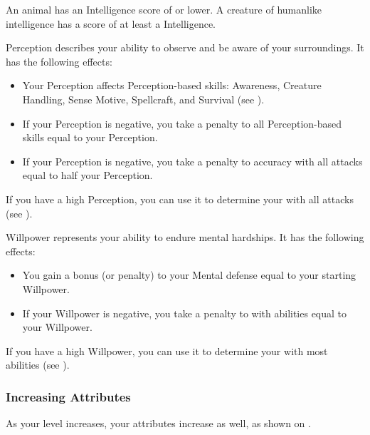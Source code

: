                 \par An animal has an Intelligence score of  or lower.
                A creature of humanlike intelligence has a score of at least a  Intelligence.

            \label{Perception}
                Perception describes your ability to observe and be aware of your surroundings.
                It has the following effects:
                \begin{itemize}
                    \item Your Perception affects Perception-based skills: Awareness, Creature Handling, Sense Motive, Spellcraft, and Survival (see ).
                    \item If your Perception is negative, you take a penalty to all Perception-based skills equal to your Perception.
                    \item If your Perception is negative, you take a penalty to accuracy with all attacks equal to half your Perception.
                \end{itemize}

                If you have a high Perception, you can use it to determine your  with all attacks (see ).

            \label{Willpower}
                Willpower represents your ability to endure mental hardships.
                It has the following effects:
                \begin{itemize}
                    \item You gain a bonus (or penalty) to your Mental defense equal to your starting Willpower.
                    \item If your Willpower is negative, you take a penalty to  with  abilities equal to your Willpower.
                \end{itemize}

                If you have a high Willpower, you can use it to determine your  with most  abilities (see ).

        \subsubsection{Increasing Attributes}\label{Increasing Attributes}
            As your level increases, your attributes increase as well, as shown on .

